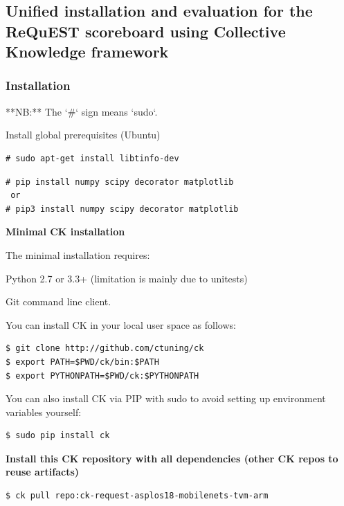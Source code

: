 \documentclass[sigplan]{acmart}
\newenvironment{packed_itemize}{
\begin{itemize}
  \setlength{\itemsep}{1pt}
  \setlength{\parskip}{0pt}
  \setlength{\parsep}{0pt}
}{\end{itemize}}
\begin{document}
\subsection{Unified installation and evaluation for the ReQuEST scoreboard using Collective Knowledge framework}

\subsubsection{Installation}

**NB:** The `\#` sign means `sudo`.

Install global prerequisites (Ubuntu)

\begin{verbatim}
# sudo apt-get install libtinfo-dev 
\end{verbatim}

\begin{verbatim}
# pip install numpy scipy decorator matplotlib
 or
# pip3 install numpy scipy decorator matplotlib
\end{verbatim}

\textbf{Minimal CK installation}

The minimal installation requires:

\begin{packed_itemize}
 \item Python 2.7 or 3.3+ (limitation is mainly due to unitests)
 \item Git command line client.
\end{packed_itemize}

You can install CK in your local user space as follows:

\begin{verbatim}
$ git clone http://github.com/ctuning/ck
$ export PATH=$PWD/ck/bin:$PATH
$ export PYTHONPATH=$PWD/ck:$PYTHONPATH
\end{verbatim}

You can also install CK via PIP with sudo to avoid setting up environment variables yourself:

\begin{verbatim}
$ sudo pip install ck
\end{verbatim}

\textbf{Install this CK repository with all dependencies (other CK repos to reuse artifacts)}

\begin{verbatim}
$ ck pull repo:ck-request-asplos18-mobilenets-tvm-arm
\end{verbatim}
\end{document}

